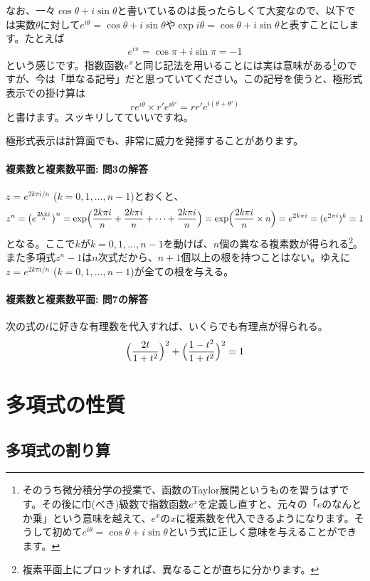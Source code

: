 
なお、一々$\cos\theta+i\sin\theta$と書いているのは長ったらしくて大変なので、以下では実数$\theta$に対して$e^{i\theta} = \cos\theta + i \sin\theta$や$\exp i\theta = \cos\theta + i \sin\theta$と表すことにします。たとえば
\[
e^{i\pi} = \cos\pi + i\sin\pi = -1
\]
という感じです。指数函数$e^x$と同じ記法を用いることには実は意味がある\footnote{そのうち微分積分学の授業で、函数のTaylor展開というものを習うはずです。その後に巾(べき)級数で指数函数$e^x$を定義し直すと、元々の「$e$のなんとか乗」という意味を越えて、$e^x$の$x$に複素数を代入できるようになります。そうして初めて$e^{i\theta}=\cos\theta+i\sin\theta$という式に正しく意味を与えることができます。}のですが、今は「単なる記号」だと思っていてください。この記号を使うと、極形式表示での掛け算は
\[
re^{i\theta} \times r'e^{i\theta'} = rr'e^{i(\theta+\theta')}
\]
と書けます。スッキリしてていいですね。

極形式表示は計算面でも、非常に威力を発揮することがあります。


\paragraph{複素数と複素数平面: 問3の解答} $z=e^{2k\pi i/n}$ ($k=0,1,\ldots,n-1$)とおくと、
\[
z^n = \bigl(e^{\frac{2k\pi i}{n}}\bigr)^n = \exp\Bigl(\frac{2k\pi i}{n}+\frac{2k\pi i}{n}+\cdots+\frac{2k\pi i}{n}\Bigr) = \exp \Bigl(\frac{2k\pi i}{n} \times n\Bigr) = e^{2k\pi i} = (e^{2\pi i})^k = 1
\]
となる。ここで$k$が$k=0,1,\ldots,n-1$を動けば、$n$個の異なる複素数が得られる\footnote{複素平面上にプロットすれば、異なることが直ちに分かります。}。また多項式$z^n-1$は$n$次式だから、$n+1$個以上の根を持つことはない。ゆえに$z=e^{2k\pi i/n}$ ($k=0,1,\ldots,n-1$)が全ての根を与える。

\paragraph{複素数と複素数平面: 問7の解答} 
次の式の$t$に好きな有理数を代入すれば、いくらでも有理点が得られる。
\[
\Bigl(\frac{2t}{1+t^2}\Bigr)^2 + \Bigl(\frac{1-t^2}{1+t^2}\Bigr)^2 = 1
\]


\section{多項式の性質}

\subsection{多項式の割り算}


